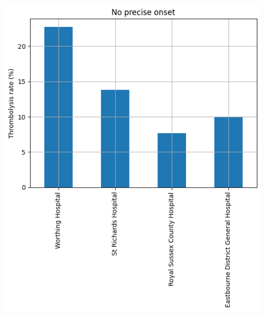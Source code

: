 \begin{frame}
\begin{columns}[T]
\begin{column}{0.5\textwidth}
      \includegraphics[width=1.0\textwidth]{./sussex/images/subgroup_precise}
    \end{column}
  \end{columns}

\end{frame}


